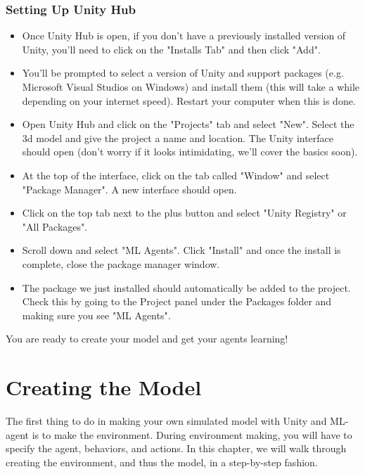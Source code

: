 \documentclass[11pt,fleqn,openany]{book} %
\begin{document}
\subsection{Setting Up Unity Hub}
\begin{itemize}
    \item Once Unity Hub is open, if you don't have a previously installed version of Unity, you'll need to click on the "Installs Tab" and then click "Add". 
    \item You'll be prompted to select a version of Unity and support packages (e.g. Microsoft Visual Studios on Windows) and install them (this will take a while depending on your internet speed). Restart your computer when this is done.
    \item Open Unity Hub and click on the "Projects" tab and select "New". Select the 3d model and give the project a name and location. The Unity interface should open (don't worry if it looks intimidating, we'll cover the basics soon).
    \item At the top of the interface, click on the tab called "Window" and select "Package Manager". A new interface should open.
    \item Click on the top tab next to the plus button and select "Unity Registry" or "All Packages". 
    \item Scroll down and select "ML Agents". Click "Install" and once the install is complete, close the package manager window.
    \item The package we just installed should automatically be added to the project. Check this by going to the Project panel under the Packages folder and making sure you see "ML Agents".
\end{itemize}
\vspace{3cm}
You are ready to create your model and get your agents learning!




\chapter{Creating the Model}
The first thing to do in making your own simulated model with Unity and ML-agent is to make the environment. During environment making, you will have to specify the agent, behaviors, and actions. In this chapter, we will walk through creating the environment, and thus the model, in a step-by-step fashion.
\end{document}
